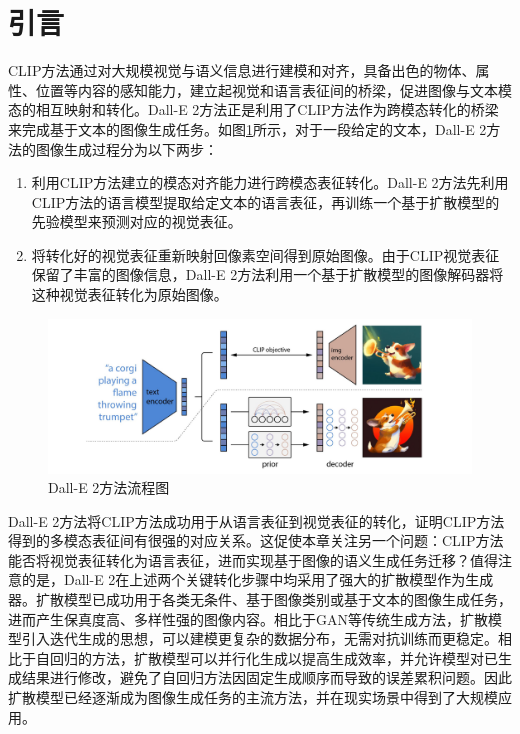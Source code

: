\section{引言}
\label{sec:ddcap-intro}
CLIP方法通过对大规模视觉与语义信息进行建模和对齐，具备出色的物体、属性、位置等内容的感知能力，建立起视觉和语言表征间的桥梁，促进图像与文本模态的相互映射和转化。Dall-E 2方法\cite{dall-e2}正是利用了CLIP方法作为跨模态转化的桥梁来完成基于文本的图像生成任务。如图\ref{fig:ddcap-dalle2}所示，对于一段给定的文本，Dall-E 2方法的图像生成过程分为以下两步：
\begin{enumerate}
    \item 利用CLIP方法建立的模态对齐能力进行跨模态表征转化。Dall-E 2方法先利用CLIP方法的语言模型提取给定文本的语言表征，再训练一个基于扩散模型\cite{ddim,ddpm}的先验模型来预测对应的视觉表征。
    \item 将转化好的视觉表征重新映射回像素空间得到原始图像。由于CLIP视觉表征保留了丰富的图像信息，Dall-E 2方法利用一个基于扩散模型的图像解码器将这种视觉表征转化为原始图像。
\end{enumerate}

\begin{figure}
  \centering
  \includegraphics[width=1.0\linewidth]{figures/ddcap-dalle2-v2.pdf}
  \caption{Dall-E 2\cite{dall-e2}方法流程图}
  \label{fig:ddcap-dalle2}
\end{figure}

Dall-E 2方法将CLIP方法成功用于从语言表征到视觉表征的转化，证明CLIP方法得到的多模态表征间有很强的对应关系。这促使本章关注另一个问题：CLIP方法能否将视觉表征转化为语言表征，进而实现基于图像的语义生成任务迁移？值得注意的是，Dall-E 2在上述两个关键转化步骤中均采用了强大的扩散模型作为生成器。扩散模型\cite{ddpm, ddim}已成功用于各类无条件、基于图像类别或基于文本的图像生成任务\cite{beatsgan, glide, latentdiff, imagen}，进而产生保真度高、多样性强的图像内容。相比于GAN\cite{gan}等传统生成方法，扩散模型引入迭代生成的思想，可以建模更复杂的数据分布，无需对抗训练而更稳定。相比于自回归的方法，扩散模型可以并行化生成以提高生成效率，并允许模型对已生成结果进行修改，避免了自回归方法因固定生成顺序而导致的误差累积问题。因此扩散模型已经逐渐成为图像生成任务的主流方法，并在现实场景中得到了大规模应用\cite{latentdiff, dall-e2}。

